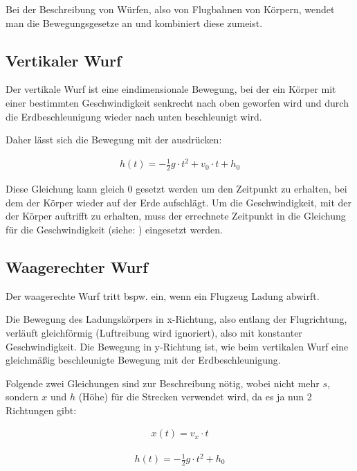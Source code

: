 Bei der Beschreibung von Würfen, also von Flugbahnen von Körpern, wendet man die Bewegungsgesetze an und kombiniert diese zumeist.


\subsection{Vertikaler Wurf}

Der vertikale Wurf ist eine eindimensionale Bewegung, bei der ein Körper mit einer bestimmten Geschwindigkeit senkrecht nach oben geworfen wird und durch die Erdbeschleunigung wieder nach unten beschleunigt wird.

Daher lässt sich die Bewegung mit der  ausdrücken:

\begin{align} \label{eq:wurfvertikal}
	h(t) = -\frac{1}{2}g \cdot t^2 + v_0 \cdot t + h_0
\end{align}

\noindent Diese Gleichung kann gleich $0$ gesetzt werden um den Zeitpunkt zu erhalten, bei dem der Körper wieder auf der Erde aufschlägt. Um die Geschwindigkeit, mit der der Körper auftrifft zu erhalten, muss der errechnete Zeitpunkt in die Gleichung für die Geschwindigkeit (siehe: ) eingesetzt werden.


\subsection{Waagerechter Wurf}

Der waagerechte Wurf tritt bspw. ein, wenn ein Flugzeug Ladung abwirft.

Die Bewegung des Ladungskörpers in x-Richtung, also entlang der Flugrichtung, verläuft gleichförmig (Luftreibung wird ignoriert), also mit konstanter Geschwindigkeit. Die Bewegung in y-Richtung ist, wie beim vertikalen Wurf eine gleichmäßig beschleunigte Bewegung mit der Erdbeschleunigung.

Folgende zwei Gleichungen sind zur Beschreibung nötig, wobei nicht mehr $s$, sondern $x$ und $h$ (Höhe) für die Strecken verwendet wird, da es ja nun 2 Richtungen gibt:

\begin{align}
	x(t) = v_x \cdot t
\end{align}

\begin{align}
	h(t) = -\frac{1}{2}g \cdot t^2 + h_0
\end{align}

